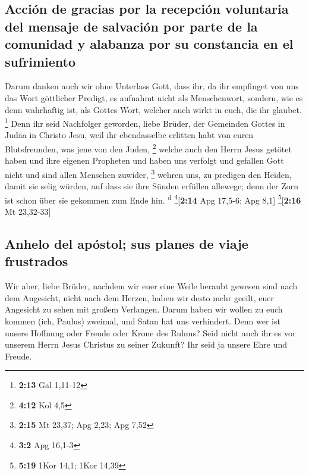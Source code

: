 \hypertarget{acciuxf3n-de-gracias-por-la-recepciuxf3n-voluntaria-del-mensaje-de-salvaciuxf3n-por-parte-de-la-comunidad-y-alabanza-por-su-constancia-en-el-sufrimiento}{%
\subsection{Acción de gracias por la recepción voluntaria del mensaje de
salvación por parte de la comunidad y alabanza por su constancia en el
sufrimiento}\label{acciuxf3n-de-gracias-por-la-recepciuxf3n-voluntaria-del-mensaje-de-salvaciuxf3n-por-parte-de-la-comunidad-y-alabanza-por-su-constancia-en-el-sufrimiento}}

 Darum danken auch wir ohne Unterlass Gott, dass ihr, da
ihr empfinget von uns das Wort göttlicher Predigt, es aufnahmt nicht als
Menschenwort, sondern, wie es denn wahrhaftig ist, als Gottes Wort,
welcher auch wirkt in euch, die ihr glaubet. \footnote{\textbf{2:13} Gal
  1,11-12}  Denn ihr seid Nachfolger geworden, liebe
Brüder, der Gemeinden Gottes in Judäa in Christo Jesu, weil ihr
ebendasselbe erlitten habt von euren Blutsfreunden, was jene von den
Juden, \footnote{\textbf{4:12} Kol 4,5}  welche auch den
Herrn Jesus getötet haben und ihre eigenen Propheten und haben uns
verfolgt und gefallen Gott nicht und sind allen Menschen zuwider,
\footnote{\textbf{2:15} Mt 23,37; Apg 2,23; Apg 7,52} 
wehren uns, zu predigen den Heiden, damit sie selig würden, auf dass sie
ihre Sünden erfüllen allewege; denn der Zorn ist schon über sie gekommen
zum Ende hin. \textsuperscript{d} \footnote{\textbf{3:2} Apg 16,1-3}{[}\textbf{2:14}
Apg 17,5-6; Apg 8,1{]} \footnote{\textbf{5:19} 1Kor 14,1; 1Kor 14,39}{[}\textbf{2:16}
Mt 23,32-33{]}

\hypertarget{anhelo-del-apuxf3stol-sus-planes-de-viaje-frustrados}{%
\subsection{Anhelo del apóstol; sus planes de viaje
frustrados}\label{anhelo-del-apuxf3stol-sus-planes-de-viaje-frustrados}}

 Wir aber, liebe Brüder, nachdem wir euer eine Weile
beraubt gewesen sind nach dem Angesicht, nicht nach dem Herzen, haben
wir desto mehr geeilt, euer Angesicht zu sehen mit großem Verlangen.
 Darum haben wir wollen zu euch kommen (ich, Paulus)
zweimal, und Satan hat uns verhindert.  Denn wer ist
unsere Hoffnung oder Freude oder Krone des Ruhms? Seid nicht auch ihr es
vor unserem Herrn Jesus Christus zu seiner Zukunft?  Ihr
seid ja unsere Ehre und Freude.

